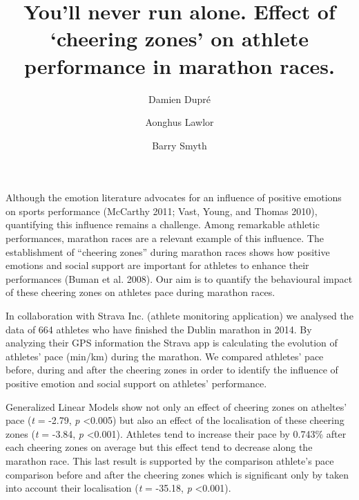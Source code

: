 \documentclass[]{elsarticle} %
\begin{document}
\begin{frontmatter}

  \title{You'll never run alone. Effect of `cheering zones' on athlete
performance in marathon races.}
    \author[University College Dublin]{Damien Dupré}
    \author[University College Dublin]{Aonghus Lawlor}
  
    \author[University College Dublin]{Barry Smyth}
  
      \address[University College Dublin]{The Insight Centre for Data Analytics, Belfield, Dublin 4}
  
  \begin{abstract}
  
  \end{abstract}
  
 \end{frontmatter}

Although the emotion literature advocates for an influence of positive
emotions on sports performance (McCarthy 2011; Vast, Young, and Thomas
2010), quantifying this influence remains a challenge. Among remarkable
athletic performances, marathon races are a relevant example of this
influence. The establishment of ``cheering zones'' during marathon races
shows how positive emotions and social support are important for
athletes to enhance their performances (Buman et al. 2008). Our aim is
to quantify the behavioural impact of these cheering zones on athletes
pace during marathon races.

In collaboration with Strava Inc. (athlete monitoring application) we
analysed the data of 664 athletes who have finished the Dublin marathon
in 2014. By analyzing their GPS information the Strava app is
calculating the evolution of athletes' pace (min/km) during the
marathon. We compared athletes' pace before, during and after the
cheering zones in order to identify the influence of positive emotion
and social support on athletes' performance.

Generalized Linear Models show not only an effect of cheering zones on
atheltes' pace (\emph{t} = -2.79, \emph{p} \textless{}0.005) but also an
effect of the localisation of these cheering zones (\emph{t} = -3.84,
\emph{p} \textless{}0.001). Athletes tend to increase their pace by
0.743\% after each cheering zones on average but this effect tend to
decrease along the marathon race. This last result is supported by the
comparison athlete's pace comparison before and after the cheering zones
which is significant only by taken into account their localisation
(\emph{t} = -35.18, \emph{p} \textless{}0.001).
\end{document}
